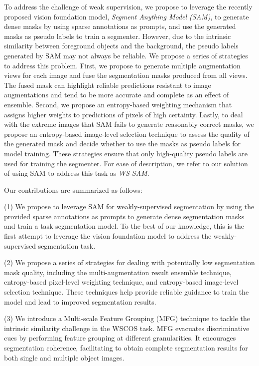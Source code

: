 To address the challenge of weak supervision, we propose to leverage the recently proposed vision foundation model, \emph{Segment Anything Model (SAM)}, to generate dense masks by using sparse annotations as prompts, and use the generated masks as pseudo labels to train a segmenter. However, due to the intrinsic similarity between foreground objects and the background, the pseudo labels generated by SAM may not always be reliable. We propose a series of strategies to address this problem. First, we propose to generate multiple augmentation views for each image and fuse the segmentation masks produced from all views. The fused mask can highlight reliable predictions resistant to image augmentations and tend to be more accurate and complete as an effect of ensemble. Second, we propose an entropy-based weighting mechanism that assigns higher weights to predictions of pixels of high certainty. Lastly, to deal with the extreme images that SAM fails to generate reasonably correct masks, we propose an entropy-based image-level selection technique to assess the quality of the generated mask and decide whether to use the masks as pseudo labels for model training. These strategies ensure that only high-quality pseudo labels are used for training the segmenter. For ease of description, we refer to our solution of using SAM to address this task as \textit{WS-SAM}.
 

Our contributions are summarized as follows: 

(1) We propose to leverage SAM for weakly-supervised segmentation by using the provided sparse annotations as prompts to generate dense segmentation masks and train a task segmentation model. To the best of our knowledge, this is the first attempt to leverage the vision foundation model to address the weakly-supervised segmentation task.

(2) We propose a series of strategies for dealing with potentially low segmentation mask quality, including the multi-augmentation result ensemble technique, entropy-based pixel-level weighting technique, and entropy-based image-level selection technique. These techniques help provide reliable guidance to train the model and lead to improved segmentation results.

(3) We introduce a Multi-scale Feature Grouping (MFG) technique to tackle the intrinsic similarity challenge in the WSCOS task. MFG evacuates discriminative cues by performing feature grouping at different granularities. It encourages segmentation coherence, facilitating to obtain complete segmentation results for both single and multiple object images.

